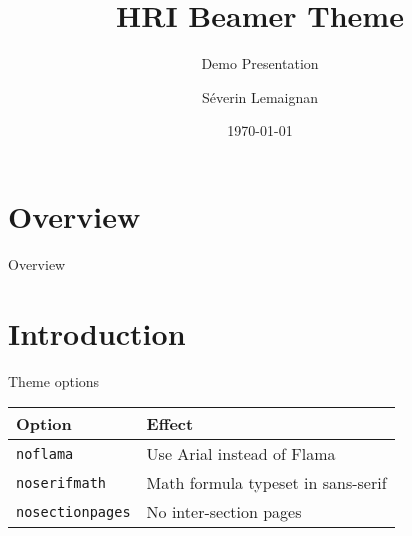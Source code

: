 \documentclass[compress]{beamer}
\title{HRI Beamer Theme}
\subtitle{Demo Presentation}
\date{\today}
\author{Séverin Lemaignan}
\institute{Computer-Human Interaction\\for Learning and Instruction {\Medium
EPFL}}
\begin{document}

\maketitle



\section*{Overview}
\begin{frame}{Overview}
	\tableofcontents[hideallsubsections]
\end{frame}

\section{Introduction}

\begin{frame}{Theme options}
\begin{table}[]
	\begin{tabularx}{\linewidth}{l>{\raggedright}X}
		\toprule
		\textbf{Option}			& \textbf{Effect} \tabularnewline
		\midrule
		\texttt{noflama}		& Use Arial instead of Flama \tabularnewline
		\texttt{noserifmath}		& Math formula typeset in sans-serif \tabularnewline
		\texttt{nosectionpages} & No inter-section pages \tabularnewline
		\bottomrule
	\end{tabularx}
	\label{tab:options}
\end{table}
\end{frame}
\end{document}
